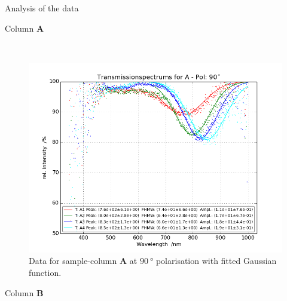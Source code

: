 \documentclass[pdftex, a4paper,11pt, twoside, UKenglish]{report}
\begin{document}
\begin{chapter}{Analysis of the data}
\begin{section}{Column \textbf{A}}
\begin{figure}[ht!]
\begin{minipage}{.95\textwidth}
          \label{fig:TransspecFIT_APol0}
        \end{minipage}\\
        \begin{minipage}{.95\textwidth}
          \centering
          \includegraphics[width=\textwidth]
              {Figures/TransspecFIT_APol90.png}
          \caption{Data for sample-column \textbf{A} at $\SI{90}{\degree}$
              polarisation with fitted Gaussian function.}
          \label{fig:TransspecFIT_APol90}
        \end{minipage}
      \end{figure}
      
    \end{section}
    
    
    
    \newpage
    \begin{section}{Column \textbf{B}}
      \label{chp::DataB}
      
      

\end{section}
\end{chapter}
\end{document}
